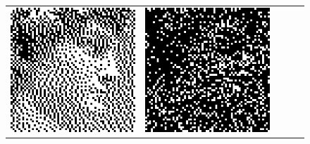 \begin{figure}
\begin{tabular}{c c c c c}
		\includegraphics[width=\tilewidth,interpolate=false]{media/chp2/associative_memory/hopfield/05_00_orig_scaled_crushed.png}&%
		\includegraphics[width=\tilewidth,interpolate=false]{media/chp2/associative_memory/hopfield/05_01_noise_scaled_crushed.png}&%

\end{tabular}
\end{figure}
